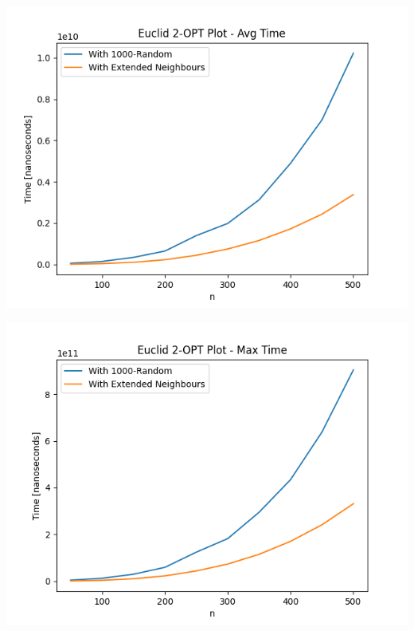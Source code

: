 \documentclass{article}
\begin{document}
\begin{center}
\includegraphics[width=\textwidth, 
                   height = 0.4\textheight, 
                   keepaspectratio]
                  {two_opt_euclid_avg_time} 
\end{center}

\begin{center}
\includegraphics[width=\textwidth, 
                   height = 0.4\textheight, 
                   keepaspectratio]
                  {two_opt_euclid_max_time} 
\end{center}
\end{document}
